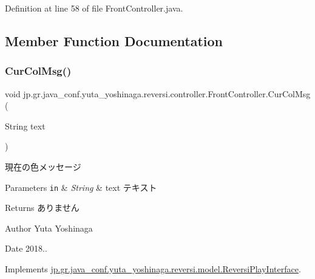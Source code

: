 Definition at line 58 of file Front\+Controller.\+java.



\subsection{Member Function Documentation}
\mbox{\label{classjp_1_1gr_1_1java__conf_1_1yuta__yoshinaga_1_1reversi_1_1controller_1_1_front_controller_ac49c44c8bb767770364c52164b699110}} 
\subsubsection{\texorpdfstring{Cur\+Col\+Msg()}{CurColMsg()}}
{\footnotesize\ttfamily void jp.\+gr.\+java\+\_\+conf.\+yuta\+\_\+yoshinaga.\+reversi.\+controller.\+Front\+Controller.\+Cur\+Col\+Msg (\begin{DoxyParamCaption}\item[{String}]{text }\end{DoxyParamCaption})}



現在の色メッセージ 


\begin{DoxyParams}[1]{Parameters}
\mbox{\tt in}  & {\em String} & text テキスト \\
\hline
\end{DoxyParams}
\begin{DoxyReturn}{Returns}
ありません 
\end{DoxyReturn}
\begin{DoxyAuthor}{Author}
Yuta Yoshinaga 
\end{DoxyAuthor}
\begin{DoxyDate}{Date}
2018.. 
\end{DoxyDate}


Implements \mbox{\hyperlink{interfacejp_1_1gr_1_1java__conf_1_1yuta__yoshinaga_1_1reversi_1_1model_1_1_reversi_play_interface}{jp.\+gr.\+java\+\_\+conf.\+yuta\+\_\+yoshinaga.\+reversi.\+model.\+Reversi\+Play\+Interface}}.



